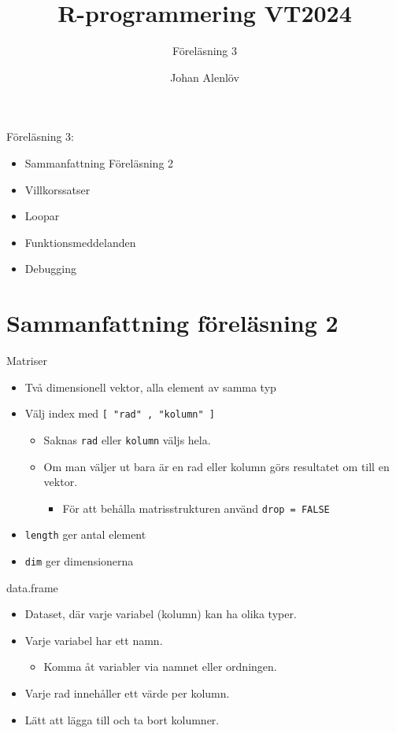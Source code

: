 \documentclass[
  11pt,
  ignorenonframetext,
]{beamer}
\title{R-programmering VT2024}
\subtitle{Föreläsning 3}
\author{Johan Alenlöv}
\date{}
\institute{Linköpings Universitet}
\providecommand{\tightlist}{%
  \setlength{\itemsep}{0pt}\setlength{\parskip}{0pt}}
\begin{document}
\frame{\titlepage}

\begin{frame}{Föreläsning 3:}
\label{fuxf6reluxe4sning-3}
\begin{itemize}
\tightlist
\item
  Sammanfattning Föreläsning 2
\item
  Villkorssatser
\item
  Loopar
\item
  Funktionsmeddelanden
\item
  Debugging
\end{itemize}
\end{frame}

\section{Sammanfattning föreläsning
2}\label{sammanfattning-fuxf6reluxe4sning-2}

\begin{frame}{Matriser}
\label{matriser}
\begin{itemize}
\tightlist
\item
  Två dimensionell vektor, alla element av samma typ
\item
  Välj index med \texttt{[ "rad" , "kolumn" ]}

  \begin{itemize}
  \tightlist
  \item
    Saknas \texttt{rad} eller \texttt{kolumn} väljs hela.
  \item
    Om man väljer ut bara är en rad eller kolumn görs resultatet om till
    en vektor.

    \begin{itemize}
    \tightlist
    \item
      För att behålla matrisstrukturen använd \texttt{drop = FALSE}
    \end{itemize}
  \end{itemize}
\item
  \texttt{length} ger antal element
\item
  \texttt{dim} ger dimensionerna
\end{itemize}
\end{frame}

\begin{frame}{data.frame}
\label{data.frame}
\begin{itemize}
\tightlist
\item
  Dataset, där varje variabel (kolumn) kan ha olika typer.
\item
  Varje variabel har ett namn.

  \begin{itemize}
  \tightlist
  \item
    Komma åt variabler via namnet eller ordningen.
  \end{itemize}
\item
  Varje rad innehåller ett värde per kolumn.
\item
  Lätt att lägga till och ta bort kolumner.
\end{itemize}
\end{frame}
\end{document}
